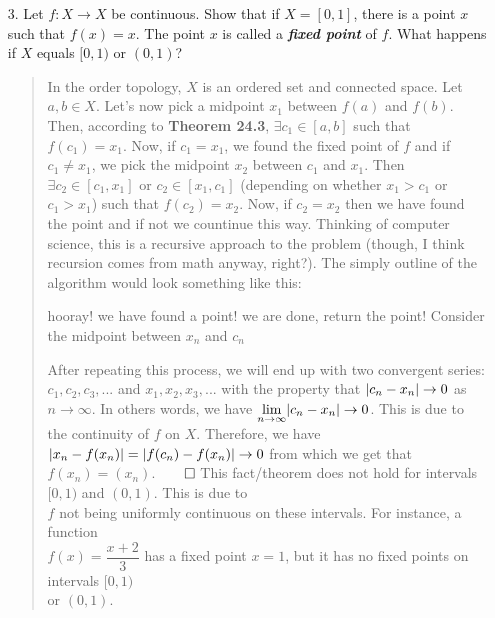 \documentclass[12pt, a4paper]{article}
\DeclarePairedDelimiter\abs{\lvert}{\rvert}
\begin{document}
\begin{itemize}
\item[]
\item[]

\item[3.]
Let $f : X \to X$ be continuous. Show that if $X = [0, 1]$,
there is a point $x$ such that $f(x) = x$. The point $x$
is called a \textbf{\textit{fixed point}} of $f$. What happens if $X$
equals $[0, 1)$ or $(0, 1)$?
\begin{quote}
In the order topology, $X$ is an ordered set and connected space.
Let $a, b \in X$. Let's now pick a midpoint $x_1$ between $f(a)$ and $f(b)$.
Then, according to \textbf{Theorem 24.3}, $\exists c_1 \in [a, b]$ such that
$f(c_1) = x_1$. Now, if $c_1 = x_1$, we found the fixed point of $f$ and if $c_1 \neq x_1$, we pick the midpoint $x_2$ between $c_1$ and $x_1$.
Then $\exists c_2 \in [c_1, x_1]$ or $c_2 \in [x_1, c_1]$ (depending on whether $x_1 > c_1$ or $c_1 > x_1$) such that 
$f(c_2) = x_2$. Now, if $c_2 = x_2$ then we have found the point and if not we countinue
this way. Thinking of computer science, this is a recursive approach to the problem (though, I think recursion comes from math anyway, right?).
The simply outline of the algorithm would look something like this:
\begin{algorithmic}
        \STATE hooray! we have found a point! we are done, return the point!
    \ELSE
        \STATE Consider the midpoint between $x_n$ and $c_n$
    \ENDIF
\end{algorithmic}

After repeating this process, we will end up with two convergent series: $c_1, c_2, c_3, ...$ and $x_1, x_2, x_3, ...$ with the property that $\abs{c_n - x_n} \to 0$ as $n \to \infty$. In others words, we have $\displaystyle\lim_{n \to \infty}\abs{c_n - x_n} \to 0$. This is due to the continuity
of $f$ on $X$. Therefore, we have $\abs{x_n - f(x_n)} = \abs{f(c_n) - f(x_n)} \to 0$ from which we get that $f(x_n) = (x_n)$.$\qed$
\newline
\newline
This fact/theorem does not hold for intervals $[0, 1)$ and $(0, 1)$. This is due to\\
\vspace{0.25cm}
$f$ not being uniformly continuous on these intervals. For instance, a function\\
\vspace{0.25cm}
$f(x) = \dfrac{x + 2}{3}$ has a fixed point $x = 1$, but
\vspace{0.25cm}
it has no fixed points on intervals $[0, 1)$\\
 or $(0, 1)$.
\end{quote}


\end{itemize}
\end{document}
